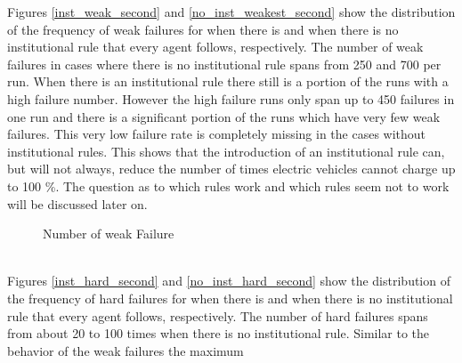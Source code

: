 \documentclass[a4paper]{article}
\begin{document}
Figures \ref{inst_weak_second} and \ref{no_inst_weakest_second}  show the distribution of the frequency of weak failures  for 
when there is and when there is no institutional rule that every agent follows, respectively. The number of weak failures in cases
where there is no institutional  rule spans from 250 and 700 per run. When there is an institutional rule there still is a portion of the 
runs with a high failure number. However the high failure runs only span up to 450 failures in one run and there is a significant 
portion of the runs which have very few weak failures. This very low failure rate is completely missing in the cases without 
institutional rules. This shows that the introduction of an institutional rule can, but will not always, reduce the number of times
electric vehicles cannot charge up to 100 \%. The question as to which rules work and which rules seem not to work will be discussed 
later on. \\
\begin{figure}[!ht]
\caption{Number of weak Failure}
\label{weakest_second}
\end{figure} \\
Figures \ref{inst_hard_second} and \ref{no_inst_hard_second}  show the distribution of the frequency of hard failures  for 
when there is and when there is no institutional rule that every agent follows, respectively. The number of hard failures spans from
about 20 to 100 times when there is no institutional rule. Similar to the behavior of the weak failures the maximum 
\end{document}
